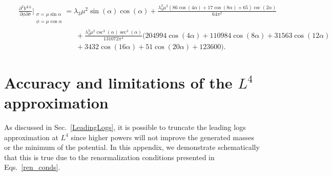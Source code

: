 \documentclass[11pt,a4paper,english,superscriptaddress,preprint,aps,prd]{revtex4}
\begin{document}
\begin{subequations}
\begin{eqnarray}
  && \frac{\partial^2 V^{LL}}{\partial \phi\partial\sigma}\Bigr |_{\substack{\sigma=\mu\sin\alpha\\\phi=\mu\cos\alpha}} = \lambda_3 \mu ^2 \sin (\alpha ) \cos (\alpha )+\frac{\lambda_3^2 \mu ^2 (86 \cos (4 \alpha )+17 \cos (8 \alpha )+65) \csc (2 \alpha )}{64 \pi ^2}\nonumber\\
  &&\qquad\qquad\qquad\qquad+\frac{\lambda_3^3 \mu ^2\csc ^3(\alpha ) \sec ^3(\alpha )}{131072 \pi ^4} (204994 \cos (4 \alpha )+110984 \cos (8 \alpha )+31563 \cos (12 \alpha )\nonumber\\
  &&\qquad\qquad\qquad\qquad+3432 \cos (16 \alpha )+51 \cos (20 \alpha )+123600).
 \end{eqnarray}
\end{subequations}


\section{Accuracy and limitations of the $L^4$ approximation}\label{Robustness}

As discussed in Sec.~\ref{LeadingLogs}, it is possible to truncate the leading logs approximation at $L^4$ since higher powers will not improve the generated masses or the minimum of the potential. In this appendix, we demonstrate schematically that this is true due to the renormalization conditions presented in Eqs.~\eqref{ren_conds}.

\end{document}
